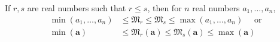 \documentclass{subfile}
\begin{document}
		\begin{theorem}
			If $r,s$ are real numbers such that $r\leq s$, then for $n$ real numbers $a_1,\ldots,a_n$,
				\begin{align*}
					\min(a_1,\ldots,a_n)
						& \leq \mathfrak{M}_r\leq \mathfrak{M}_s\leq\max(a_1,\ldots,a_n)\quad\mbox{ or}\\
					\min{(\mathbf{a})}
						& \leq \mathfrak{M}_r(\mathbf{a})\leq \mathfrak{M}_s(\mathbf{a})\leq\max{(\mathbf{a})}
				\end{align*}
		\end{theorem}
\end{document}
